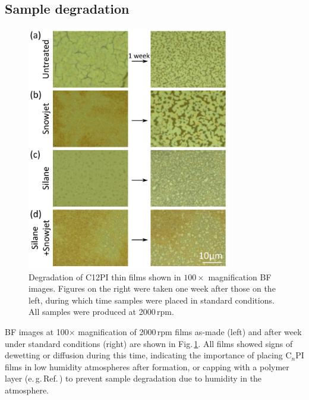 \subsection{Sample degradation}
\begin{figure}[ht]
\centering
\includegraphics[width=0.8\textwidth]{Fig4}
\caption{Degradation of C12PI thin films shown in $100\times$ magnification BF images. Figures on the right were taken one week after those on the left, during which time samples were placed in standard conditions. All samples were produced at 2000\,rpm.}
\label{4Fig4}
\end{figure}
BF images at 100$\times$ magnification of 2000\,rpm films as-made (left) and after week under standard conditions (right) are shown in Fig.\,\ref{4Fig4}. All films showed signs of dewetting or diffusion during this time, indicating the importance of placing C$_n$PI films in low humidity atmospheres after formation, or capping with a polymer layer (e.\,g.\,Ref.\,\cite{Pradeesh2009}) to prevent sample degradation due to humidity in the atmosphere.

